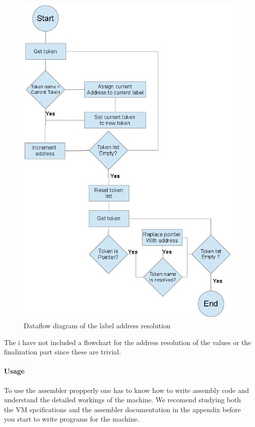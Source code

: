 \documentclass{article}
\begin{document}
\begin{figure}[H]
\begin{centering}
\includegraphics[width=\textwidth,height=\textheight,keepaspectratio]{address.png}
\caption{Dataflow diagram of the label address resolution}
\end{centering}
\end{figure}
\newpage
The i have not included a flowchart for the address resolution of the values or
the finalization part since these are trivial.
\paragraph{Usage}  
To use the assembler propperly one has to know how to write assembly code and
understand the detailed workings of the machine. We recomend studying both the
VM spcifications and the assembler documentation in the appendix before you
start to write programs for the machine.
\end{document}

